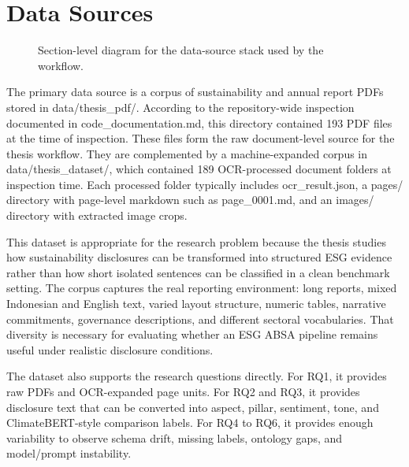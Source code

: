 \section{Data Sources}

\begin{figure}[ht]
\begin{center}
\end{center}
\caption{Section-level diagram for the data-source stack used by the workflow.}
\label{fig:implementation-data-sources}
\end{figure}

The primary data source is a corpus of sustainability and annual report PDFs stored in data/thesis\_pdf/. According to the repository-wide inspection documented in code\_documentation.md, this directory contained 193 PDF files at the time of inspection. These files form the raw document-level source for the thesis workflow. They are complemented by a machine-expanded corpus in data/thesis\_dataset/, which contained 189 OCR-processed document folders at inspection time. Each processed folder typically includes ocr\_result.json, a pages/ directory with page-level markdown such as page\_0001.md, and an images/ directory with extracted image crops.

This dataset is appropriate for the research problem because the thesis studies how sustainability disclosures can be transformed into structured ESG evidence rather than how short isolated sentences can be classified in a clean benchmark setting. The corpus captures the real reporting environment: long reports, mixed Indonesian and English text, varied layout structure, numeric tables, narrative commitments, governance descriptions, and different sectoral vocabularies. That diversity is necessary for evaluating whether an ESG ABSA pipeline remains useful under realistic disclosure conditions.

The dataset also supports the research questions directly. For RQ1, it provides raw PDFs and OCR-expanded page units. For RQ2 and RQ3, it provides disclosure text that can be converted into aspect, pillar, sentiment, tone, and ClimateBERT-style comparison labels. For RQ4 to RQ6, it provides enough variability to observe schema drift, missing labels, ontology gaps, and model/prompt instability.


